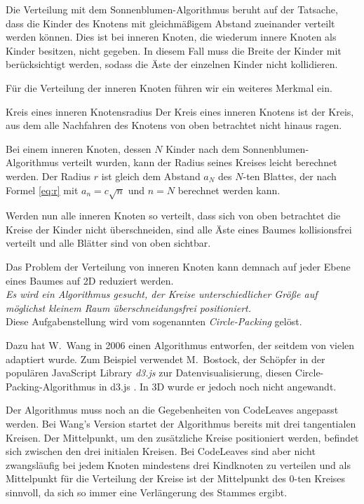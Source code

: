 Die Verteilung mit dem Sonnenblumen-Algorithmus beruht auf der Tatsache, dass die Kinder des Knotens mit gleichmäßigem Abstand zueinander verteilt werden können. Dies ist bei inneren Knoten, die wiederum innere Knoten als Kinder besitzen, nicht gegeben. In diesem Fall muss die Breite der Kinder mit berücksichtigt werden, sodass die Äste der einzelnen Kinder nicht kollidieren.

Für die Verteilung der inneren Knoten führen wir ein weiteres Merkmal ein.

\begin{defbox}{Kreis eines inneren Knotens}{radius}
   Der Kreis eines inneren Knotens ist der Kreis, aus dem alle Nachfahren des Knotens von oben betrachtet nicht hinaus ragen.
\end{defbox}

Bei einem inneren Knoten, dessen $N$ Kinder nach dem Sonnenblumen-Algorithmus verteilt wurden, kann der Radius seines Kreises leicht berechnet werden. Der Radius $r$ ist gleich dem Abstand $a_N$ des $N$-ten Blattes, der nach Formel \ref{eq:r} mit $a_n = c \sqrt{n}$ und $n = N$ berechnet werden kann.

Werden nun alle inneren Knoten so verteilt, dass sich von oben betrachtet die Kreise der Kinder nicht überschneiden, sind alle Äste eines Baumes kollisionsfrei verteilt und alle Blätter sind von oben sichtbar.

Das Problem der Verteilung von inneren Knoten kann demnach auf jeder Ebene eines Baumes auf 2D reduziert werden.\\

\textit{Es wird ein Algorithmus gesucht, der Kreise unterschiedlicher Größe auf möglichst kleinem Raum überschneidungsfrei positioniert.}\\

Diese Aufgabenstellung wird vom sogenannten \textit{Circle-Packing} gelöst.

Dazu hat W.\ Wang in \cite{wang2006visualization} 2006 einen Algorithmus entworfen, der seitdem von vielen adaptiert wurde. Zum Beispiel verwendet M.\ Bostock, der Schöpfer in der populären JavaScript Library \textit{d3.js} zur Datenvisualisierung, diesen Circle-Packing-Algorithmus in d3.js \cite{bostock2017abetter}. In 3D wurde er jedoch noch nicht angewandt.

Der Algorithmus muss noch an die Gegebenheiten von CodeLeaves angepasst werden. Bei Wang's Version startet der Algorithmus bereits mit drei tangentialen Kreisen. Der Mittelpunkt, um den zusätzliche Kreise positioniert werden, befindet sich zwischen den drei initialen Kreisen. Bei CodeLeaves sind aber nicht zwangsläufig bei jedem Knoten mindestens drei Kindknoten zu verteilen und als Mittelpunkt für die Verteilung der Kreise ist der Mittelpunkt des $0$-ten Kreises sinnvoll, da sich so immer eine Verlängerung des Stammes ergibt.

